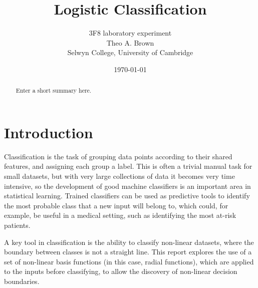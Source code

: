\documentclass[a4paper]{article}
\begin{document}
    \title{Logistic Classification}
    \author{3F8 laboratory experiment \\ Theo A. Brown \\ Selwyn College, University of Cambridge}
    \date{\today}
    \maketitle

    \begin{abstract}
        Enter a short summary here.
    \end{abstract}

    \section{Introduction}\label{sec:introduction}
    Classification is the task of grouping data points according to their shared features, and assigning each group
    a label. This is often a trivial manual task for small datasets, but with very large collections of data it
    becomes very time intensive, so the development of good machine classifiers is an important area in statistical
    learning. Trained classifiers can be used as predictive tools to identify the most probable class that a new
    input will belong to, which could, for example, be useful in a medical setting, such as identifying the most
    at-risk patients.

    A key tool in classification is the ability to classify non-linear datasets, where the boundary between classes
    is not a straight line. This report explores the use of a set of non-linear basis functions (in this case,
    radial functions), which are applied to the inputs before classifying, to allow the discovery of non-linear
    decision boundaries.
\end{document}
